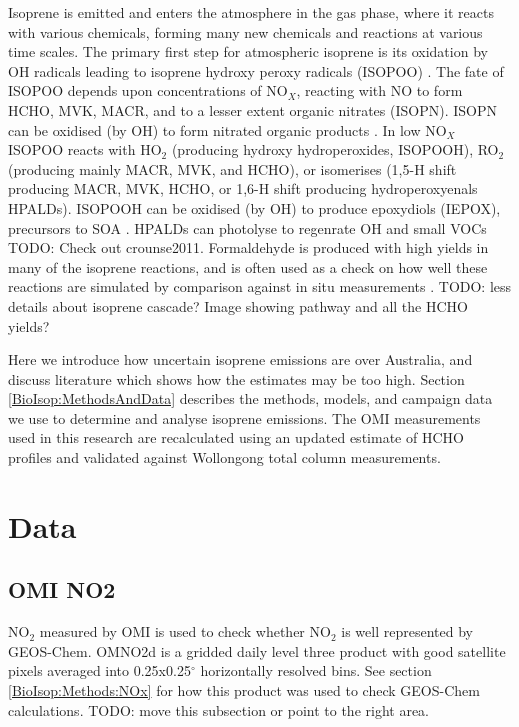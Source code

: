  Isoprene is emitted and enters the atmosphere in the gas phase, where it reacts with various chemicals, forming many new chemicals and reactions at various time scales.
  The primary first step for atmospheric isoprene is its oxidation by OH radicals leading to isoprene hydroxy peroxy radicals (ISOPOO) \citep{Wolfe2016,Marvin2017}.
  The fate of ISOPOO depends upon concentrations of NO$_X$, reacting with NO to form HCHO, MVK, MACR, and to a lesser extent organic nitrates (ISOPN).
  ISOPN can be oxidised (by OH) to form nitrated organic products \citep{Paulot2009a}.
  In low NO$_X$ ISOPOO reacts with HO$_2$ (producing hydroxy hydroperoxides, ISOPOOH), RO$_2$ (producing mainly MACR, MVK, and HCHO), or isomerises (1,5-H shift producing MACR, MVK, HCHO, or 1,6-H shift producing hydroperoxyenals HPALDs). 
  ISOPOOH can be oxidised (by OH) to produce epoxydiols (IEPOX), precursors to SOA \citep{Paulot2009b}. 
  HPALDs can photolyse to regenrate OH and small VOCs \citep{Crounse2011, Wolfe2012, Peeters2014} TODO: Check out crounse2011.
  Formaldehyde is produced with high yields in many of the isoprene reactions, and is often used as a check on how well these reactions are simulated by comparison against in situ measurements \citep{Marvin2017}.
  TODO: less details about isoprene cascade? Image showing pathway and all the HCHO yields?
  
  Here we introduce how uncertain isoprene emissions are over Australia, and discuss literature which shows how the estimates may be too high.
  Section \ref{BioIsop:MethodsAndData} describes the methods, models, and campaign data we use to determine and analyse isoprene emissions.
  The OMI measurements used in this research are recalculated using an updated estimate of HCHO profiles and validated against Wollongong total column measurements. 
  
\section{Data}
  \label{BioIsop:Data}  
  
  \subsection{OMI NO2}
    NO$_2$ measured by OMI is used to check whether NO$_2$ is well represented by GEOS-Chem. 
    OMNO2d is a gridded daily level three product with good satellite pixels averaged into 0.25x0.25$^{\circ}$ horizontally resolved bins.
    See section \ref{BioIsop:Methods:NOx} for how this product was used to check GEOS-Chem calculations. TODO: move this subsection or point to the right area.
  
